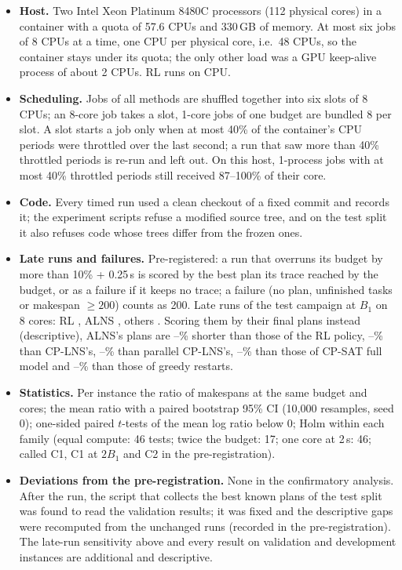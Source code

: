 \documentclass[10pt]{article}
\begin{document}
\begin{itemize}
\item \textbf{Host.} Two Intel Xeon Platinum 8480C processors (112 physical cores) in a container with a quota of 57.6
  CPUs and 330\,GB of memory. At most six jobs of 8 CPUs at a time, one CPU per physical core, i.e.\ 48 CPUs, so the container
  stays under its quota; the only other load was a GPU keep-alive process of about 2 CPUs. RL runs on CPU.
\item \textbf{Scheduling.} Jobs of all methods are shuffled together into six slots of 8 CPUs; an 8-core job takes a
  slot, 1-core jobs of one budget are bundled 8 per slot. A slot starts a job only when at most 40\% of the container's
  CPU periods were throttled over the last second; a run that saw more than 40\% throttled periods is re-run and left
  out. On this host, 1-process jobs with at most 40\% throttled periods still received 87--100\% of their core.
\item \textbf{Code.} Every timed run used a clean checkout of a fixed commit and records it; the experiment scripts refuse a
  modified source tree, and on the test split it also refuses code whose trees differ from the frozen ones.
\item \textbf{Late runs and failures.} Pre-registered: a run that overruns its budget by more than 10\% + 0.25\,s is
  scored by the best plan its trace reached by the budget, or as a failure if it keeps no trace; a failure (no plan,
  unfinished tasks or makespan $\ge 200$) counts as 200. Late runs of the test campaign at $B_1$ on 8 cores: RL
  \LateRL, ALNS \LateALNS, others \LateOther. Scoring them by their final plans instead (descriptive), ALNS's plans are
  \Sensrlgainlo--\Sensrlgainhi\% shorter than those of the RL policy, \Senscpsatgainlo--\Senscpsatgainhi\% than
  CP-LNS's, \Senspcpsatgainlo--\Senspcpsatgainhi\% than parallel CP-LNS's, \Senscpfullgainlo--\Senscpfullgainhi\% than
  those of CP-SAT full model and \Sensconstructgainlo--\Sensconstructgainhi\% than those of greedy restarts.
\item \textbf{Statistics.} Per instance the ratio of makespans at the same budget and cores; the mean ratio with a
  paired bootstrap 95\% CI (10,000 resamples, seed 0); one-sided paired $t$-tests of the mean log ratio below 0; Holm
  within each family (equal compute: 46 tests; twice the budget: 17; one core at 2\,s: 46; called C1, C1 at $2B_1$
  and C2 in the pre-registration).
\item \textbf{Deviations from the pre-registration.} None in the confirmatory analysis. After the run, the script
  that collects the best known plans of the test split was found to read the validation results; it was fixed and
  the descriptive gaps were recomputed from the unchanged runs (recorded in the pre-registration). The late-run sensitivity above
  and every result on validation and development instances are additional and descriptive.
\end{itemize}
\end{document}
